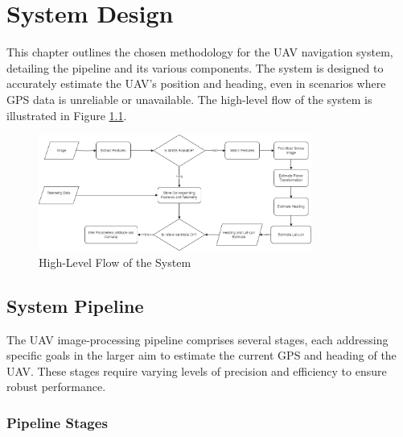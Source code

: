 

\chapter{System Design}

This chapter outlines the chosen methodology for the UAV navigation system, detailing the pipeline and its various components. The system is designed to accurately estimate the UAV's position and heading, even in scenarios where GPS data is unreliable or unavailable. The high-level flow of the system is illustrated in Figure \ref{fig:HighLevelFlow}.

\begin{figure}[H]
    \centering
    \includegraphics[width=0.8\textwidth]{Chapter 3/Chap3Figs/HighLevelFlow.png}
    \caption{High-Level Flow of the System}
    \label{fig:HighLevelFlow}
\end{figure}




\section{System Pipeline}

The UAV image-processing pipeline comprises several stages, each addressing specific goals in the larger aim to estimate the current GPS and heading of the UAV. These stages require varying levels of precision and efficiency to ensure robust performance.

\subsection{Pipeline Stages}

